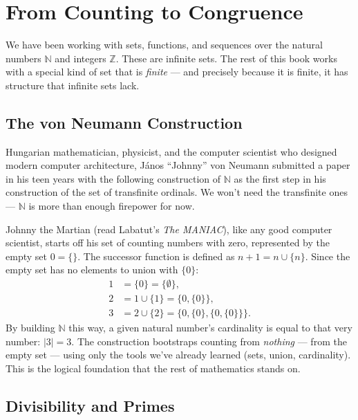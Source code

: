 \section{From Counting to Congruence}
\label{sec:bridge}

We have been working with sets, functions, and sequences over the natural
numbers $\mathbb{N}$ and integers $\mathbb{Z}$. These are infinite sets.
The rest of this book works with a special kind of set that is \emph{finite}
--- and precisely because it is finite, it has structure that infinite sets
lack.

\subsection{The von Neumann Construction}

Hungarian mathematician, physicist, and the computer scientist who designed
modern computer architecture, J\'{a}nos ``Johnny'' von Neumann submitted a
paper in his teen years with the following construction of $\mathbb{N}$ as the
first step in his construction of the set of transfinite ordinals. We won't
need the transfinite ones --- $\mathbb{N}$ is more than enough firepower for
now.

Johnny the Martian (read Labatut's \emph{The MANIAC}), like any good computer
scientist, starts off his set of counting numbers with zero, represented by
the empty set $0 = \{\}$. The successor function is defined as $n + 1 = n
\cup \{n\}$. Since the empty set has no elements to union with $\{0\}$:
\begin{align*}
    1 &= \{0\} = \{\emptyset\}, \\
    2 &= 1 \cup \{1\} = \{0, \{0\}\}, \\
    3 &= 2 \cup \{2\} = \{0, \{0\}, \{0, \{0\}\}\}.
\end{align*}
By building $\mathbb{N}$ this way, a given natural number's cardinality is
equal to that very number: $|3| = 3$. The construction bootstraps counting
from \emph{nothing} --- from the empty set --- using only the tools we've
already learned (sets, union, cardinality). This is the logical foundation
that the rest of mathematics stands on.

\subsection{Divisibility and Primes}

